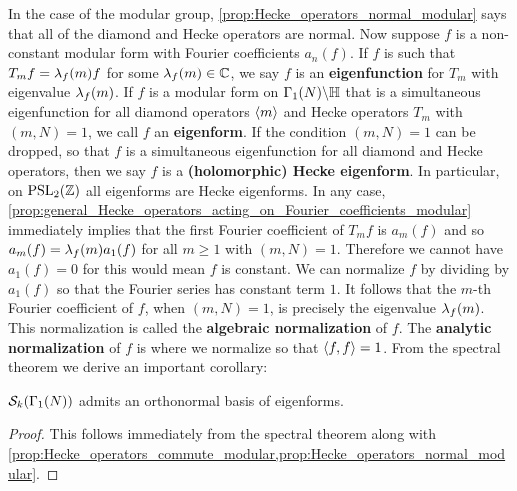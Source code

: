      In the case of the modular group, \cref{prop:Hecke_operators_normal_modular} says that all of the diamond and Hecke operators are normal. Now suppose $f$ is a non-constant modular form with Fourier coefficients $a_{n}(f)$. If $f$ is such that $T_{m}f = \lambda_{f}(m)f$ for some $\lambda_{f}(m) \in \mathbb{C}$, we say $f$ is an \textbf{eigenfunction} for $T_{m}$ with eigenvalue $\lambda_{f}(m)$. If $f$ is a modular form on $\Gamma_{1}(N)\backslash\mathbb{H}$ that is a simultaneous eigenfunction for all diamond operators $\langle m\rangle$ and Hecke operators $T_{m}$ with $(m,N) = 1$, we call $f$ an \textbf{eigenform}. If the condition $(m,N) = 1$ can be dropped, so that $f$ is a simultaneous eigenfunction for all diamond and Hecke operators, then we say $f$ is a \textbf{(holomorphic) Hecke eigenform}. In particular, on $\mathrm{PSL}_{2}(\mathbb{Z})$ all eigenforms are Hecke eigenforms. In any case, \cref{prop:general_Hecke_operators_acting_on_Fourier_coefficients_modular} immediately implies that the first Fourier coefficient of $T_{m}f$ is $a_{m}(f)$ and so $a_{m}(f) = \lambda_{f}(m)a_{1}(f)$ for all $m \ge 1$ with $(m,N) = 1$. Therefore we cannot have $a_{1}(f) = 0$ for this would mean $f$ is constant. We can normalize $f$ by dividing by $a_{1}(f)$ so that the Fourier series has constant term $1$. It follows that the $m$-th Fourier coefficient of $f$, when $(m,N) = 1$, is precisely the eigenvalue $\lambda_{f}(m)$. This normalization is called the \textbf{algebraic normalization} of $f$. The \textbf{analytic normalization} of $f$ is where we normalize so that $\langle f,f\rangle = 1$. From the spectral theorem we derive an important corollary:

      \begin{theorem}\label{thm:eigenforms_forms_spectral_theory_modular}
        $\mathcal{S}_{k}(\Gamma_{1}(N))$ admits an orthonormal basis of eigenforms.
      \end{theorem}
      \begin{proof}
        This follows immediately from the spectral theorem along with \cref{prop:Hecke_operators_commute_modular,prop:Hecke_operators_normal_modular}.
      \end{proof}

